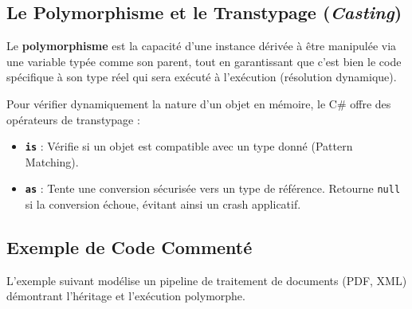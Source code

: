 \subsection{Le Polymorphisme et le Transtypage (\textit{Casting})}

Le \textbf{polymorphisme} est la capacité d'une instance dérivée à être manipulée via une variable typée comme son parent, tout en garantissant que c'est bien le code spécifique à son type réel qui sera exécuté à l'exécution (résolution dynamique). 

Pour vérifier dynamiquement la nature d'un objet en mémoire, le C\# offre des opérateurs de transtypage :
\begin{itemize}
    \item \textbf{\texttt{is}} : Vérifie si un objet est compatible avec un type donné (Pattern Matching).
    \item \textbf{\texttt{as}} : Tente une conversion sécurisée vers un type de référence. Retourne \texttt{null} si la conversion échoue, évitant ainsi un crash applicatif.
\end{itemize}

\subsection{Exemple de Code Commenté}

L'exemple suivant modélise un pipeline de traitement de documents (PDF, XML) démontrant l'héritage et l'exécution polymorphe.


